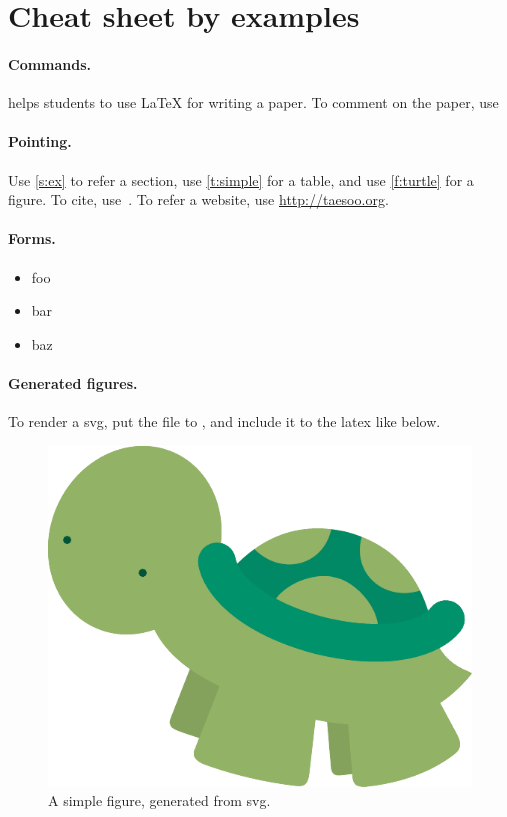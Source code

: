 \section{Cheat sheet by examples}
\label{s:ex}

\paragraph{Commands.}
\sys helps students to use {\LaTeX} for writing a paper.
To comment on the paper, use

\paragraph{Pointing.}
Use \autoref{s:ex} to refer a section, 
use \autoref{t:simple} for a table,
and use \autoref{f:turtle} for a figure. 
To cite, use~\cite{kim:userfs,kim:poirot}. 
To refer a website, use \url{http://taesoo.org}. 

\paragraph{Forms.}

\begin{itemize}[noitemsep,nolistsep]
 \setlength{\itemsep}{-0pt}
 \item foo
 \item bar
 \item baz
\end{itemize}

\paragraph{Generated figures.}

To render a svg, put the file to , and include 
it to the latex like below. 

\begin{figure}[h]
\centering
\footnotesize
\includegraphics[width=0.5\columnwidth]{fig/ex-turtle}
\caption{A simple figure, generated from svg.}
\label{f:turtle}
\end{figure}

